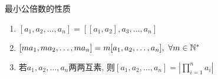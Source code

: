 \begin{frame}{最小公倍数的性质}
	\label{prime:prop:gcdlcm-lcm}

	\begin{enumerate}
		\item<1-> \([a_1,a_2,\dots,a_n]=[[a_1,a_2],a_3,\dots,a_n]\)
		\item<2-> \([ma_1,ma_2,\dots,ma_n]=m[a_1,a_2,\dots,a_n],~\forall m\in\Bbb{N}^*\)
		\item<3-> 若\(a_1,a_2,\dots,a_n\)两两互素, 则\([a_1,a_2,\dots,a_n]=|\prod_{i=1}^na_i|\)
	\end{enumerate}
\end{frame}
